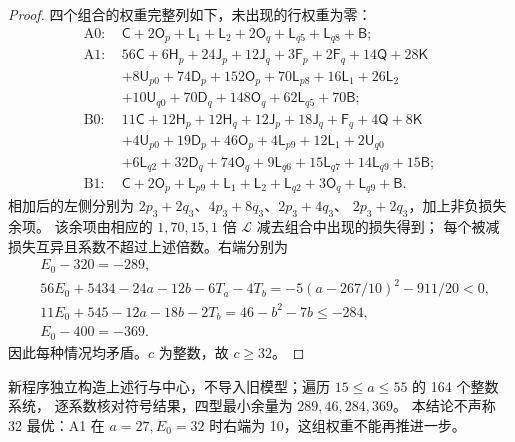 \documentclass[11pt,a4paper]{article}
\theoremstyle{definition}
\begin{document}
\begin{proof}
四个组合的权重完整列如下，未出现的行权重为零：
\begin{align*}
\mathrm{A0}:~&\mathsf C+2\mathsf O_p+\mathsf L_1+\mathsf L_2
 +2\mathsf O_q+\mathsf L_{q5}+\mathsf L_{q8}+\mathsf B;\\
\mathrm{A1}:~&56\mathsf C+6\mathsf H_p+24\mathsf J_p+12\mathsf J_q
 +3\mathsf F_p+2\mathsf F_q+14\mathsf Q+28\mathsf K\\
 &+8\mathsf U_{p0}+74\mathsf D_p+152\mathsf O_p+70\mathsf L_{p8}
 +16\mathsf L_1+26\mathsf L_2\\
 &+10\mathsf U_{q0}+70\mathsf D_q+148\mathsf O_q+62\mathsf L_{q5}+70\mathsf B;\\
\mathrm{B0}:~&11\mathsf C+12\mathsf H_p+12\mathsf H_q+12\mathsf J_p+18\mathsf J_q
 +\mathsf F_q+4\mathsf Q+8\mathsf K\\
 &+4\mathsf U_{p0}+19\mathsf D_p+46\mathsf O_p+4\mathsf L_{p9}
 +12\mathsf L_1+2\mathsf U_{q0}\\
 &+6\mathsf L_{q2}+32\mathsf D_q+74\mathsf O_q+9\mathsf L_{q6}
 +15\mathsf L_{q7}+14\mathsf L_{q9}+15\mathsf B;\\
\mathrm{B1}:~&\mathsf C+2\mathsf O_p+\mathsf L_{p9}+\mathsf L_1+\mathsf L_2
 +\mathsf L_{q2}+3\mathsf O_q+\mathsf L_{q9}+\mathsf B.
\end{align*}
相加后的左侧分别为 $2p_3+2q_3$、$4p_3+8q_3$、$2p_3+4q_3$、
$2p_3+2q_3$，加上非负损失余项。
该余项由相应的 $1,70,15,1$ 倍 $\mathcal L$ 减去组合中出现的损失得到；
每个被减损失互异且系数不超过上述倍数。右端分别为
\begin{align*}
 &E_0-320=-289,\\
 &56E_0+5434-24a-12b-6T_a-4T_b
   =-5(a-267/10)^2-911/20<0,\\
 &11E_0+545-12a-18b-2T_b=46-b^2-7b\le-284,\\
 &E_0-400=-369.
\end{align*}
因此每种情况均矛盾。$c$ 为整数，故 $c\ge32$。
\end{proof}
新程序独立构造上述行与中心，不导入旧模型；遍历 $15\le a\le55$ 的 164 个整数系统，
逐系数核对符号结果，四型最小余量为 $289,46,284,369$。
本结论不声称 32 最优：A1 在 $a=27,E_0=32$ 时右端为 10，这组权重不能再推进一步。
\end{document}
